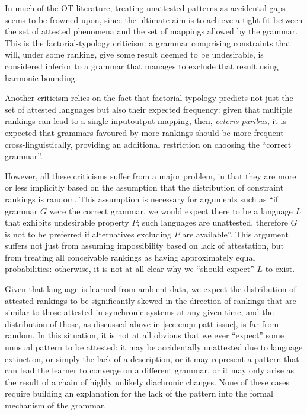In much of the OT literature, treating unattested patterns as accidental gaps seems to be frowned upon, since the ultimate aim is to achieve a tight fit between the set of attested phenomena and the set of mappings allowed by the grammar. This is the factorial\hyp typology criticism: a grammar comprising constraints that will, under some ranking, give some result deemed to be undesirable, is considered inferior to a grammar that manages to exclude that result using harmonic bounding.

Another criticism relies on the fact that factorial typology predicts not just the set of attested languages but also their expected frequency: given that multiple rankings can lead to a single input\dash output mapping, then, \emph{ceteris paribus}, it is expected that grammars favoured by more rankings should be more frequent cross\hyp linguistically, providing an additional restriction on choosing the \enquote{correct grammar}.

However, all these criticisms suffer from a major problem, in that they are more or less implicitly based on the assumption that the distribution of constraint rankings is random. This assumption is necessary for arguments such as \enquote{if grammar $G$ were the correct grammar, we would expect there to be a language $L$ that exhibits undesirable property $P$; such languages are unattested, therefore $G$ is not to be preferred if alternatives excluding $P$ are available}. This argument suffers not just from assuming impossibility based on lack of attestation, but from treating all conceivable rankings as having approximately equal probabilities: otherwise, it is not at all clear why we \enquote{should expect} $L$ to exist.

Given that language is learned from ambient data, we expect the distribution of attested rankings to be significantly skewed in the direction of rankings that are similar to those attested in synchronic systems at any given time, and the distribution of those, as discussed above in \cref{sec:enqu-patt-issue}, is far from random. In this situation, it is not at all obvious that we ever \enquote{expect} some unusual pattern to be attested: it may be accidentally unattested due to language extinction, or simply the lack of a description, or it may represent a pattern that can lead the learner to converge on a different grammar, or it may only arise as the result of a chain of highly unlikely diachronic changes. None of these cases require building an explanation for the lack of the pattern into the formal mechanism of the grammar.

